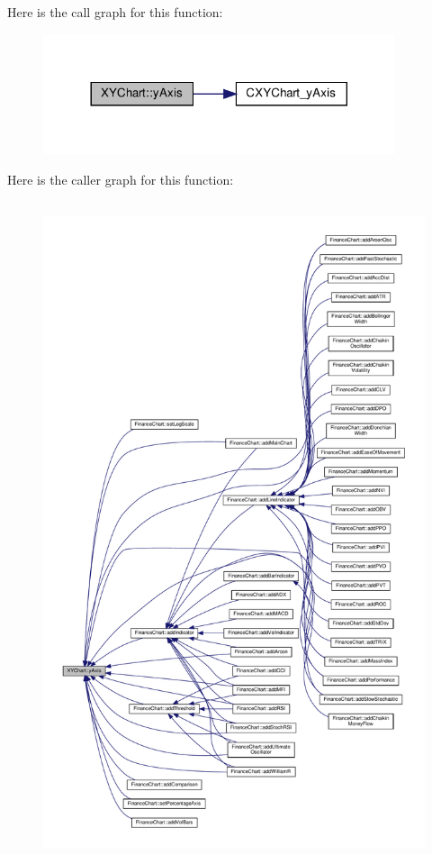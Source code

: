 Here is the call graph for this function\+:
\nopagebreak
\begin{figure}[H]
\begin{center}
\leavevmode
\includegraphics[width=293pt]{class_x_y_chart_a22adca1189b6caa260d71fe4122033ab_cgraph}
\end{center}
\end{figure}
Here is the caller graph for this function\+:
\nopagebreak
\begin{figure}[H]
\begin{center}
\leavevmode
\includegraphics[height=550pt]{class_x_y_chart_a22adca1189b6caa260d71fe4122033ab_icgraph}
\end{center}
\end{figure}
\mbox{\label{class_x_y_chart_aaddf44015a8d6eb406c548ea4b644d5c}} 
